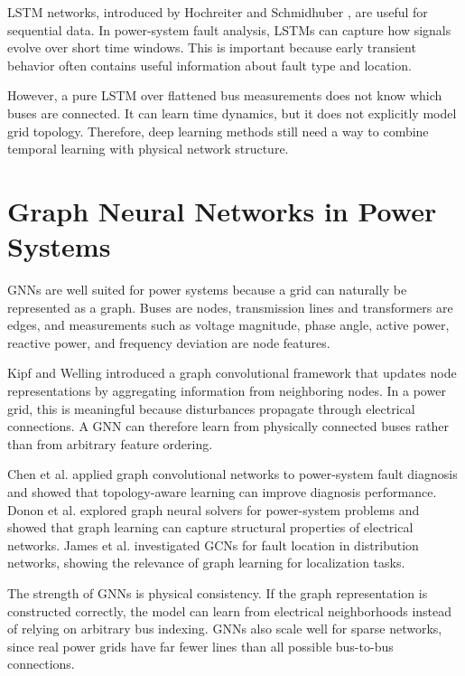 \documentclass[12pt,a4paper]{article}
\begin{document}
LSTM networks, introduced by Hochreiter and Schmidhuber \cite{hochreiter1997}, are useful for sequential data. In power-system fault analysis, LSTMs can capture how signals evolve over short time windows. This is important because early transient behavior often contains useful information about fault type and location.

However, a pure LSTM over flattened bus measurements does not know which buses are connected. It can learn time dynamics, but it does not explicitly model grid topology. Therefore, deep learning methods still need a way to combine temporal learning with physical network structure.

\section{Graph Neural Networks in Power Systems}

GNNs are well suited for power systems because a grid can naturally be represented as a graph. Buses are nodes, transmission lines and transformers are edges, and measurements such as voltage magnitude, phase angle, active power, reactive power, and frequency deviation are node features.

Kipf and Welling \cite{kipf2017} introduced a graph convolutional framework that updates node representations by aggregating information from neighboring nodes. In a power grid, this is meaningful because disturbances propagate through electrical connections. A GNN can therefore learn from physically connected buses rather than from arbitrary feature ordering.

Chen et al. \cite{chen2020} applied graph convolutional networks to power-system fault diagnosis and showed that topology-aware learning can improve diagnosis performance. Donon et al. \cite{donon2019} explored graph neural solvers for power-system problems and showed that graph learning can capture structural properties of electrical networks. James et al. \cite{james2020} investigated GCNs for fault location in distribution networks, showing the relevance of graph learning for localization tasks.

The strength of GNNs is physical consistency. If the graph representation is constructed correctly, the model can learn from electrical neighborhoods instead of relying on arbitrary bus indexing. GNNs also scale well for sparse networks, since real power grids have far fewer lines than all possible bus-to-bus connections.
\end{document}
